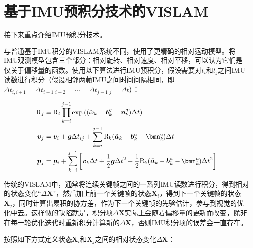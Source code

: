 \section{基于IMU预积分技术的VISLAM}

接下来重点介绍IMU预积分技术\citep{forster2017manifold}。

与普通基于IMU积分的VISLAM系统不同，\citep{forster2017manifold}使用了更精确的相对运动模型。将IMU观测模型包含三个部分：相对旋转、相对速度、相对平移，可以认为它们是仅关于偏移量的函数。使用以下算法进行IMU预积分，假设需要对$t_i$和$t_j$之间IMU读数进行积分（假设相邻两帧IMU之间时间间隔相同，即$\Delta t_{i,i+1} = \Delta t_{i+1,i+2} = \cdots = \Delta t_{j-1,j} = \Delta t$）：

\begin{equation}
\begin{aligned}
\mathrm{R}_j &= \mathrm{R}_i \prod_{k=i}^{j-1}
                \exp\left(
                    (\tilde{\bm\omega}_k - \bm{b}_k^g - \bm{n}_k^g) \Delta t
                \right) \\
\bm{v}_j &= \bm{v}_i + \bm{g} \Delta t_{ij} + \sum_{k=i}^{j-1}
                \mathrm{R}_k (\tilde{\bm a}_k - \bm{b}_k^a - \bmn_k^a) \Delta t \\
\bm{p}_j &= \bm{p}_i + \sum_{k=i}^{j-1}
                \left[
                    \bm{v}_k \Delta t +
                    \frac{1}{2}\bm{g}\Delta t^2 +
                    \frac{1}{2}\mathrm{R}_k
                    (\tilde{\bm a}_k - \bm{b}_k^a - \bmn_k^a) \Delta t^2
                \right]
    \end{aligned}
\end{equation}

传统的VISLAM中，通常将连续关键帧之间的一系列IMU读数进行积分，得到相对的状态变化“$\Delta\bm X$”，然后加上前一个关键帧的状态$\bm{X}_i$，得到下一个关键帧的状态$\bm{X}_j$，同时计算出累积的协方差，作为下一个关键帧的先验估计，参与到视觉的优化中去。这样做的缺陷就是，积分项$\Delta\bm X$实际上会随着偏移量的更新而改变，除非在每一轮优化迭代时重新积分计算新的$\Delta\bm X$，否则IMU积分项的误差会一直存在。

按照如下方式定义状态$\bm{X}_i$和$\bm{X}_j$之间的相对状态变化$\Delta\bm X$：

